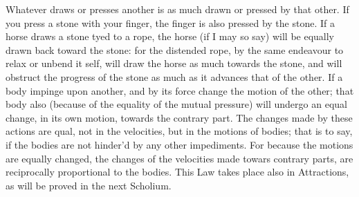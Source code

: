 \begin{itemize}
      Whatever draws or presses another is as much drawn or pressed by that
      other. If you press a stone with your finger, the finger is also pressed by
      the stone. If a horse draws a stone tyed to a rope, the horse (if I may so
      say) will be equally drawn back toward the stone: for the distended rope,
      by the same endeavour to relax or unbend it self, will draw the horse as
      much towards the stone, and will obstruct the progress of the stone as
      much as it advances that of the other. If a body impinge upon another, and
      by its force change the motion of the other; that body also (because of
      the equality of the mutual pressure) will undergo an equal change, in its
      own motion, towards the contrary part. The changes made by these actions
      are qual, not in the velocities, but in the motions of bodies; that is to
      say, if the bodies are not hinder'd by any other impediments. For because
      the motions are equally changed, the changes of the velocities made towars
      contrary parts, are reciprocally proportional to the bodies. This Law
      takes place also in Attractions, as will be proved in the next Scholium.
\end{itemize}
%
%
%

